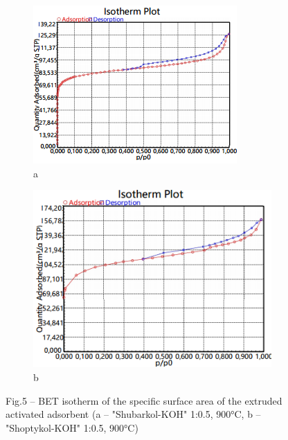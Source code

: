 \begin{figure}[H]
    \centering
    \begin{subfigure}[b]{0.45\textwidth}
        \centering
        \includegraphics[width=\textwidth]{media/chem2/image21}
        \caption*{a}
    \end{subfigure}
    \begin{subfigure}[b]{0.46\textwidth}
        \centering
        \includegraphics[width=\textwidth]{media/chem2/image22}
        \caption*{b}
    \end{subfigure}
    \caption*{Fig.5 -- BET isotherm of the specific surface area of the extruded activated adsorbent (a -- "Shubarkol-KOH" 1:0.5, 900°C, b -- "Shoptykol-KOH" 1:0.5, 900°C)}
\end{figure}

